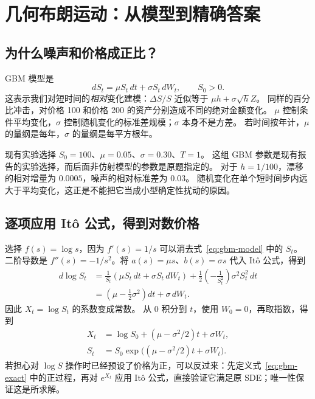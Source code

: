 \section{几何布朗运动：从模型到精确答案}\label{sec:gbm}
\subsection{为什么噪声和价格成正比？}
GBM 模型是
\begin{equation}\label{eq:gbm-model}
 dS_t=\mu S_t\,dt+\sigma S_t\,dW_t,\qquad S_0>0.
\end{equation}
这表示我们对短时间的\emph{相对}变化建模：$\Delta S/S$ 近似等于 $\mu h+\sigma\sqrt h Z$。
同样的百分比冲击，对价格 100 和价格 200 的资产分别造成不同的绝对金额变化。
$\mu$ 控制条件平均变化，$\sigma$ 控制随机变化的标准差规模；$\sigma$ 本身不是方差。
若时间按年计，$\mu$ 的量纲是每年，$\sigma$ 的量纲是每平方根年。

现有实验选择 $S_0=100$、$\mu=0.05$、$\sigma=0.30$、$T=1$。
这组 GBM 参数是现有报告的实验选择，而后面非仿射模型的参数是原题指定的。
对于 $h=1/100$，漂移的相对增量为 $0.0005$，噪声的相对标准差为 $0.03$。
随机变化在单个短时间步内远大于平均变化，这正是不能把它当成小型确定性扰动的原因。

\subsection{逐项应用 Itô 公式，得到对数价格}
选择 $f(s)=\log s$，因为 $f'(s)=1/s$ 可以消去式~\eqref{eq:gbm-model} 中的 $S_t$。
二阶导数是 $f''(s)=-1/s^2$。将 $a(s)=\mu s$、$b(s)=\sigma s$ 代入 Itô 公式，得到
\begin{equation}\label{eq:gbm-log-derive}
\begin{aligned}
 d\log S_t
 &=\frac1{S_t}(\mu S_t\,dt+\sigma S_t\,dW_t)
   +\frac12\left(-\frac1{S_t^2}\right)\sigma^2S_t^2\,dt\\
 &=\left(\mu-\frac12\sigma^2\right)dt+\sigma\,dW_t.
\end{aligned}
\end{equation}
因此 $X_t=\log S_t$ 的系数变成常数。
从 $0$ 积分到 $t$，使用 $W_0=0$，再取指数，得到
\begin{align}
 X_t&=\log S_0+(\mu-\sigma^2/2)t+\sigma W_t,\label{eq:gbm-log-exact}\\
 S_t&=S_0\exp\bigl((\mu-\sigma^2/2)t+\sigma W_t\bigr).\label{eq:gbm-exact}
\end{align}
若担心对 $\log S$ 操作时已经预设了价格为正，可以反过来：先定义式~\eqref{eq:gbm-exact} 中的正过程，再对 $e^{X_t}$ 应用 Itô 公式，直接验证它满足原 SDE；唯一性保证这是所求解。

